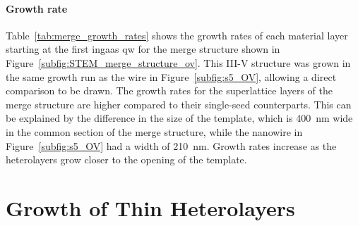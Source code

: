 \paragraph{Growth rate} Table~\ref{tab:merge_growth_rates} shows the growth rates of each material layer starting at the first \acs{ingaas} \acl{qw} for the merge structure shown in Figure~\ref{subfig:STEM_merge_structure_ov}. This III-V structure was grown in the same growth run as the wire in Figure~\ref{subfig:s5_OV}, allowing a direct comparison to be drawn. The growth rates for the superlattice layers of the merge structure are higher compared to their single-seed counterparts. This can be explained by the difference in the size of the template, which is \qty{400}{\nano\metre} wide in the common section of the merge structure, while the nanowire in Figure~\ref{subfig:s5_OV} had a width of \qty{210}{\nano\metre}. Growth rates increase as the heterolayers grow closer to the opening of the template.

\section{Growth of Thin Heterolayers}

